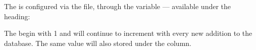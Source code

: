 The  is configured via the  file, through the  variable --- available under the \code{[bmi]} heading:


The  begin with 1 and will continue to increment with every new addition to the database.  The same value will also stored under the  column.

